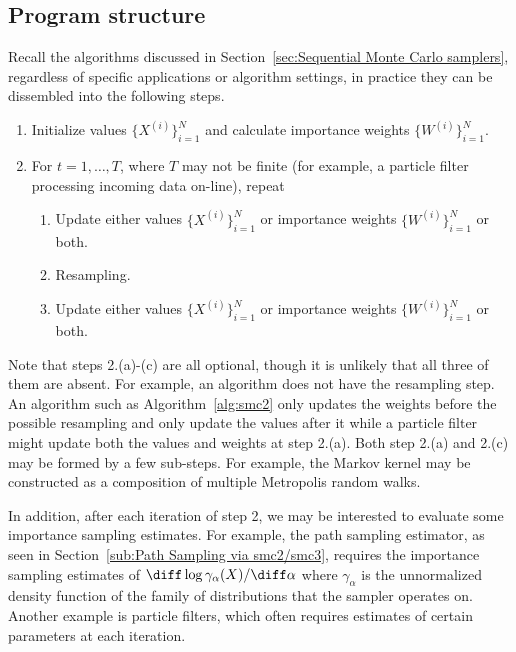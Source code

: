 \subsection{Program structure}
\label{sub:Program structure}

Recall the \smc algorithms discussed in Section~\ref{sec:Sequential Monte Carlo samplers}, regardless of specific applications or algorithm settings, in practice they can be dissembled into the following steps.
\begin{enumerate}
  \item Initialize values $\{X^{(i)}\}_{i=1}^N$ and calculate importance weights $\{W^{(i)}\}_{i=1}^N$.
  \item For $t = 1,\dots,T$, where $T$ may not be finite (for example, a particle filter processing incoming data on-line), repeat
    \begin{enumerate}
      \item Update either values $\{X^{(i)}\}_{i=1}^N$ or importance weights $\{W^{(i)}\}_{i=1}^N$ or both.
      \item Resampling.
      \item Update either values $\{X^{(i)}\}_{i=1}^N$ or importance weights $\{W^{(i)}\}_{i=1}^N$ or both.
    \end{enumerate}
\end{enumerate}
Note that steps 2.(a)-(c) are all optional, though it is unlikely that all three of them are absent. For example, an \ais algorithm does not have the resampling step. An \smc algorithm such as Algorithm~\ref{alg:smc2} only updates the weights before the possible resampling and only update the values after it while a particle filter might update both the values and weights at step 2.(a). Both step 2.(a) and 2.(c) may be formed by a few sub-steps. For example, the Markov kernel may be constructed as a composition of multiple Metropolis random walks.

In addition, after each iteration of step 2, we may be interested to evaluate some importance sampling estimates. For example, the path sampling estimator, as seen in Section~\ref{sub:Path Sampling via smc2/smc3}, requires the importance sampling estimates of $\diff\log\gamma_{\alpha}(X)/\diff\alpha$ where $\gamma_{\alpha}$ is the unnormalized density function of the family of distributions that the \smc sampler operates on. Another example is particle filters, which often requires estimates of certain parameters at each iteration.


